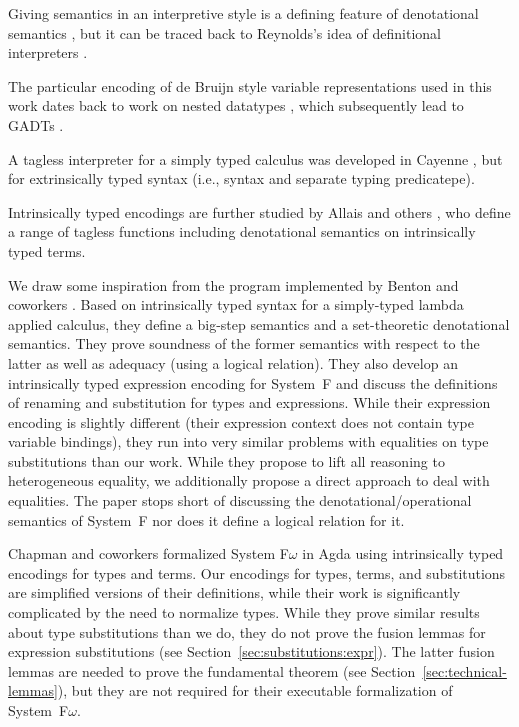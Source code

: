 \documentclass[acmsmall,anonymous,review,screen]{acmart}
\begin{document}
Giving semantics in an interpretive style is a defining feature of
denotational semantics \cite{Schmidt1986}, but it can be traced back
to Reynolds's idea of definitional interpreters \cite{Reynolds1975}.

The particular encoding of de Bruijn style variable representations
used in this work dates back to work on nested datatypes
\cite{DBLP:conf/mpc/BirdM98,DBLP:journals/jfp/BirdP99,DBLP:conf/csl/AltenkirchR99},
which subsequently lead to GADTs
\cite{cheney03:_first_class_phant_types}.

A tagless interpreter for a simply typed calculus was developed in
Cayenne \cite{augustsson99}, but for extrinsically typed syntax (i.e.,
syntax and separate typing predicatepe).

Intrinsically typed encodings are further studied by Allais and others
\cite{DBLP:conf/cpp/Allais0MM17}, who define a range of tagless
functions including denotational semantics on intrinsically typed
terms. 

We draw some inspiration from the program implemented by Benton and coworkers
\cite{DBLP:journals/jar/BentonHKM12}. Based on intrinsically typed
syntax for a simply-typed lambda applied calculus, they define a
big-step semantics and a set-theoretic denotational semantics. They
prove soundness of the former semantics with respect to the latter as
well as adequacy (using a logical relation). They also develop an
intrinsically typed expression encoding for System~F and discuss the
definitions of renaming and substitution for types and expressions.
While their expression encoding is slightly different (their
expression context does not contain type variable bindings), they run
into very similar problems with equalities on type substitutions than
our work. While they propose to lift all reasoning to heterogeneous
equality, we additionally propose a direct approach to deal with
equalities. 
The paper stops short of discussing the denotational/operational
semantics of System~F nor does it define a logical relation for it.

Chapman and coworkers \cite{DBLP:conf/mpc/ChapmanKNW19} formalized
System F$\omega$ in Agda using intrinsically typed encodings for types
and terms. Our encodings for types, terms, and substitutions are
simplified versions of their definitions, while their work is
significantly complicated by the need to normalize types. While they
prove similar results about type substitutions than we do, they do not
prove the fusion lemmas for expression substitutions (see
Section~\ref{sec:substitutions:expr}). The latter fusion lemmas are needed to
prove the fundamental theorem (see
Section~\ref{sec:technical-lemmas}), but they are not required for
their executable formalization of System~F$\omega$.
\end{document}
